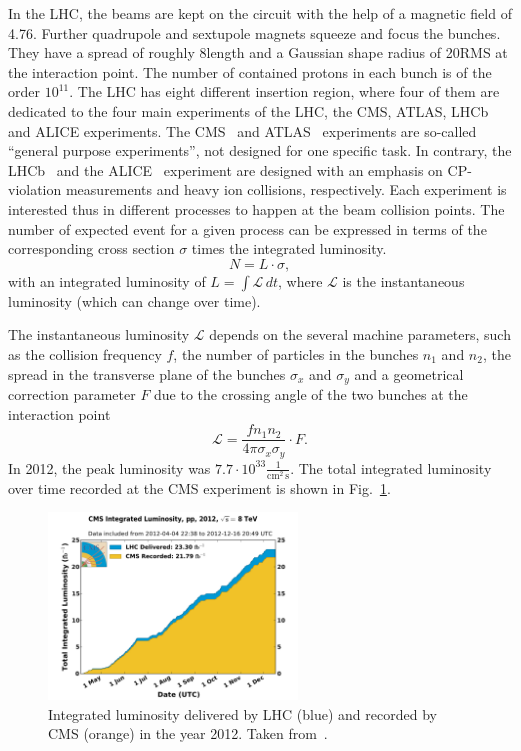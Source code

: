 In the LHC, the beams are kept on the circuit with the help of a magnetic field of 4.76\tesla.
Further quadrupole and sextupole magnets squeeze and focus the bunches.
They have a spread of roughly 8\cm length and a Gaussian shape radius of 20\mum RMS at the interaction point.
The number of contained protons in each bunch is of the order $10^{11}$.
The LHC has eight different insertion region, where four of them are dedicated to the four main experiments of the LHC, the CMS, ATLAS, LHCb and ALICE experiments.
The CMS~\cite{bib:CMS:experiment,bib:CMS:TDR} and ATLAS~\cite{bib:ATLAS:experiment,bib:ATLAS:TDR_1,bib:ATLAS:TDR_2} experiments are so-called ``general purpose experiments'', not designed for one specific task.
In contrary, the LHCb~\cite{bib:LHCb:experiment} and the ALICE~\cite{bib:ALICE:experiment} experiment are designed with an emphasis on CP-violation measurements and heavy ion collisions, respectively.
Each experiment is interested thus in different processes to happen at the beam collision points.
The number of expected event for a given process can be expressed in terms of the corresponding cross section $\sigma$ times the integrated luminosity.
\begin{equation}
N = L \cdot \sigma,
\end{equation}
with an integrated luminosity of $L=\int \mathcal{L}\, dt$, where $\mathcal{L}$ is the instantaneous luminosity (which can change over time).

The instantaneous luminosity $\mathcal{L}$ depends on the several machine parameters, such as the collision frequency $f$, the number of particles in the bunches $n_1$ and $n_2$,
the spread in the transverse plane of the bunches $\sigma_x$ and $\sigma_y$ and a geometrical correction parameter $F$ due to the crossing angle of the two bunches at the interaction point
\begin{equation}
\mathcal{L} = \frac{f n_1 n_2 }{4 \pi \sigma_x \sigma_y} \cdot F.
\end{equation}
In 2012, the peak luminosity was $7.7 \cdot 10^{33} \frac{1}{\text{cm}^2\,\text{s}}$.
The total integrated luminosity over time recorded at the CMS experiment is shown in Fig.~\ref{fig:Lumi}.

\begin{figure}[!b]
  \centering
      \includegraphics[width=0.59\textwidth]{figures/experiment/LHC/int_lumi_per_day_cumulative_pp_2012.pdf}
  \caption{Integrated luminosity delivered by LHC (blue) and recorded by CMS (orange) in the year 2012. Taken from~\cite{bib:LumiWiki}.}  
  \label{fig:Lumi}
\end{figure}

